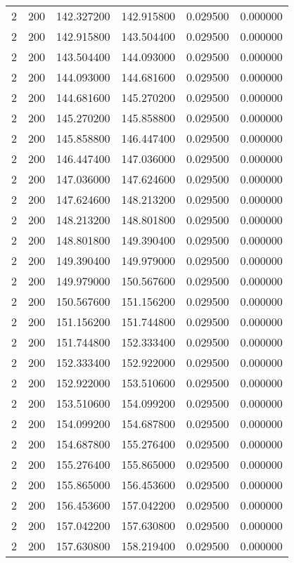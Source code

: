 \begin{longtable}{rrrrrr}
2 & 200 & 142.327200 & 142.915800 & 0.029500 & 0.000000 \\
2 & 200 & 142.915800 & 143.504400 & 0.029500 & 0.000000 \\
2 & 200 & 143.504400 & 144.093000 & 0.029500 & 0.000000 \\
2 & 200 & 144.093000 & 144.681600 & 0.029500 & 0.000000 \\
2 & 200 & 144.681600 & 145.270200 & 0.029500 & 0.000000 \\
2 & 200 & 145.270200 & 145.858800 & 0.029500 & 0.000000 \\
2 & 200 & 145.858800 & 146.447400 & 0.029500 & 0.000000 \\
2 & 200 & 146.447400 & 147.036000 & 0.029500 & 0.000000 \\
2 & 200 & 147.036000 & 147.624600 & 0.029500 & 0.000000 \\
2 & 200 & 147.624600 & 148.213200 & 0.029500 & 0.000000 \\
2 & 200 & 148.213200 & 148.801800 & 0.029500 & 0.000000 \\
2 & 200 & 148.801800 & 149.390400 & 0.029500 & 0.000000 \\
2 & 200 & 149.390400 & 149.979000 & 0.029500 & 0.000000 \\
2 & 200 & 149.979000 & 150.567600 & 0.029500 & 0.000000 \\
2 & 200 & 150.567600 & 151.156200 & 0.029500 & 0.000000 \\
2 & 200 & 151.156200 & 151.744800 & 0.029500 & 0.000000 \\
2 & 200 & 151.744800 & 152.333400 & 0.029500 & 0.000000 \\
2 & 200 & 152.333400 & 152.922000 & 0.029500 & 0.000000 \\
2 & 200 & 152.922000 & 153.510600 & 0.029500 & 0.000000 \\
2 & 200 & 153.510600 & 154.099200 & 0.029500 & 0.000000 \\
2 & 200 & 154.099200 & 154.687800 & 0.029500 & 0.000000 \\
2 & 200 & 154.687800 & 155.276400 & 0.029500 & 0.000000 \\
2 & 200 & 155.276400 & 155.865000 & 0.029500 & 0.000000 \\
2 & 200 & 155.865000 & 156.453600 & 0.029500 & 0.000000 \\
2 & 200 & 156.453600 & 157.042200 & 0.029500 & 0.000000 \\
2 & 200 & 157.042200 & 157.630800 & 0.029500 & 0.000000 \\
2 & 200 & 157.630800 & 158.219400 & 0.029500 & 0.000000 \\

\end{longtable}
